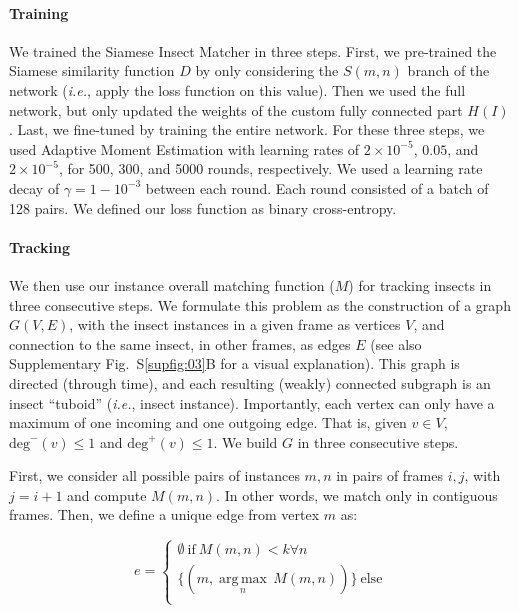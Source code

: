 \documentclass[12pt]{article}
\begin{document}
\begin{linenumbers}
		\paragraph{Training}
		We trained the Siamese Insect Matcher in three steps. First, we pre-trained the Siamese similarity function $D$ by only considering the $S(m,n)$ branch of the network (\emph{i.e.}, apply the loss function on this value). Then we used the full network, but only updated the weights of the custom fully connected part $H(I)$. Last, we fine-tuned by training the entire network. For these three steps, we used Adaptive Moment Estimation with learning rates of $2\times{}10^{-5}$, $0.05$, and $2\times{}10^{-5}$, for 500, 300, and 5000 rounds, respectively. We used a learning rate decay of $\gamma = 1- 10^{-3}$ between each round. Each round consisted of a batch of 128 pairs. We defined our loss function as binary cross-entropy.

		\paragraph{Tracking}
		We then use our instance overall matching function ($M$) for tracking insects in three consecutive steps. We formulate this problem as the construction of a graph $G(V, E)$, with the insect instances in a given frame as vertices $V$, and connection to the same insect, in other frames, as edges $E$ (see also Supplementary Fig.~S\ref{supfig:03}B for a visual explanation). This graph is directed (through time), and each resulting (weakly) connected subgraph is an insect “tuboid” (\emph{i.e.}, insect instance). Importantly, each vertex can only have a maximum of one incoming and one outgoing edge. That is, given $v \in V$, $\text{deg}^-(v) \le 1$ and $\text{deg}^+(v) \le 1$. We build $G$ in three consecutive steps. 

		First, we consider all possible pairs of instances $m, n$ in pairs of frames $i, j$, with $j=i+1$ and compute $M(m,n)$. In other words, we match only in contiguous frames. Then, we define a unique edge from vertex $m$ as:

		\begin{equation}
			\label{eq:01}
			e = \begin{cases}
				\emptyset~\text{if}~M(m,n)<k \forall n \\
				\{(m, \underset{n}{\operatorname{arg\,max}}\,M(m,n))\}~\text{else} \\
			\end{cases}
		\end{equation}


\end{linenumbers}
\end{document}
